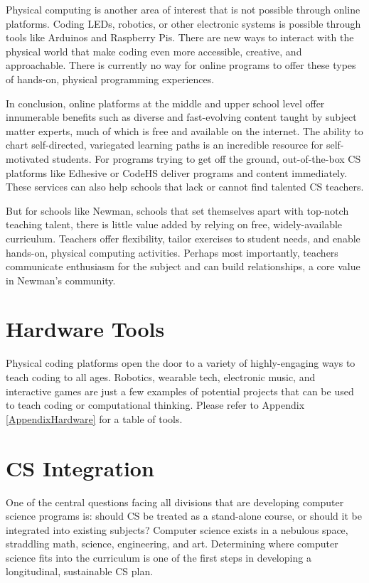  Physical computing is another area of interest that is not possible through online platforms. Coding LEDs, robotics, or other electronic systems is possible through tools like Arduinos and Raspberry Pis. There are new ways to interact with the physical world that make coding even more accessible, creative, and approachable. There is currently no way for online programs to offer these types of hands-on, physical programming experiences. \par
In conclusion, online platforms at the middle and upper school level offer innumerable benefits such as diverse and fast-evolving content taught by subject matter experts, much of which is free and available on the internet. The ability to chart self-directed, variegated learning paths is an incredible resource for self-motivated students. For programs trying to get off the ground, out-of-the-box CS platforms like Edhesive or CodeHS deliver programs and content immediately. These services can also help schools that lack or cannot find talented CS teachers. \par
But for schools like Newman, schools that set themselves apart with top-notch teaching talent, there is little value added by relying on free, widely-available curriculum. Teachers offer flexibility, tailor exercises to student needs, and enable hands-on, physical computing activities. Perhaps most importantly, teachers communicate enthusiasm for the subject and can build relationships, a core value in Newman's community.\par
\section{Hardware Tools}
Physical coding platforms open the door to a variety of highly-engaging ways to teach coding to all ages. Robotics, wearable tech, electronic music, and interactive games are just a few examples of potential projects that can be used to teach coding or computational thinking. Please refer to Appendix \ref{AppendixHardware} for a table of tools.

\section{CS Integration} \label{csint}
One of the central questions facing all divisions that are developing computer science programs is: should CS be treated as a stand-alone course, or should it be integrated into existing subjects? Computer science exists in a nebulous space, straddling math, science, engineering, and art. Determining where computer science fits into the curriculum is one of the first steps in developing a longitudinal, sustainable CS plan.\par

